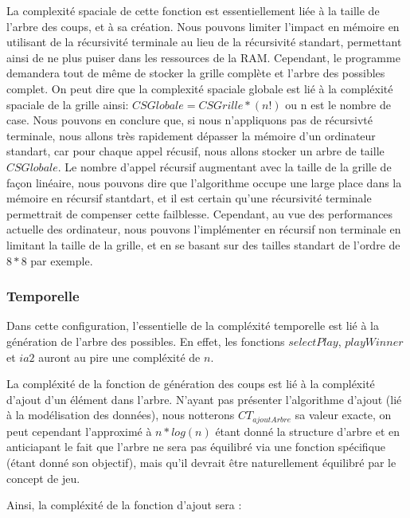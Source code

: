 \documentclass[a4paper,12pt]{report}
\begin{document}
La complexit\'e spaciale de cette fonction est essentiellement li\'ee \`a la taille de l'arbre des coups, et \`a sa cr\'eation. Nous pouvons limiter l'impact en m\'emoire en utilisant de la r\'ecursivit\'e terminale au lieu de la r\'ecursivit\'e standart, permettant ainsi de ne plus puiser dans les ressources de la RAM. Cependant, le programme demandera tout de m\^eme de stocker la grille compl\`ete et l'arbre des possibles complet. On peut dire que la complexit\'e spaciale globale est li\'e \`a la compl\'exit\'e spaciale de la grille ainsi: $CSGlobale=CSGrille*(n!)$ ou n est le nombre de case. Nous pouvons en conclure que, si nous n'appliquons pas de r\'ecursivt\'e terminale, nous allons tr\`es rapidement d\'epasser la m\'emoire d'un ordinateur standart, car pour chaque appel r\'ecusif, nous allons stocker un arbre de taille $CSGlobale$. Le nombre d'appel r\'ecursif augmentant avec la taille de la grille de fa\c{c}on lin\'eaire, nous pouvons dire que l'algorithme occupe une large place dans la m\'emoire en r\'ecursif stantdart, et il est certain qu'une r\'ecursivit\'e terminale permettrait de compenser cette failblesse. Cependant, au vue des performances actuelle des ordinateur, nous pouvons l'impl\'ementer en r\'ecursif non terminale en limitant la taille de la grille, et en se basant sur des tailles \og{}standart\fg{} de l'ordre de $8*8$ par exemple.

\subsubsection{Temporelle}

Dans cette configuration, l'essentielle de la compl\'exit\'e temporelle est li\'e \`a la g\'en\'eration de l'arbre des possibles. En effet, les fonctions $selectPlay$, $playWinner$ et $ia2$ auront au pire une compl\'exit\'e de $n$. 

La compl\'exit\'e de la fonction de g\'en\'eration des coups est li\'e \`a la compl\'exit\'e d'ajout d'un \'el\'ement dans l'arbre. N'ayant pas pr\'esenter l'algorithme d'ajout (li\'e \`a la mod\'elisation des donn\'ees), nous notterons $CT_{ajoutArbre}$ sa valeur exacte, on peut cependant l'approxim\'e \`a $n*log(n)$ \'etant donn\'e la structure d'arbre et en anticiapant le fait que l'arbre ne sera pas \'equilibr\'e via une fonction sp\'ecifique (\'etant donn\'e son objectif), mais qu'il devrait \^etre naturellement \'equilibr\'e par le concept de jeu.

Ainsi, la compl\'exit\'e de la fonction d'ajout sera : 
\end{document}
